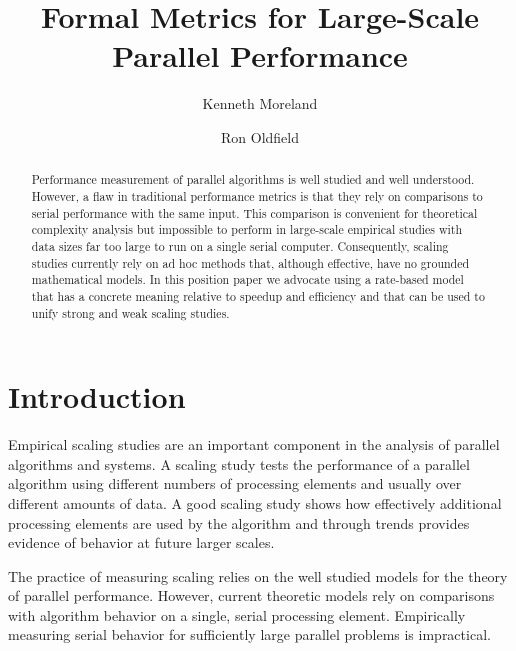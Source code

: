 \documentclass{llncs}
\begin{document}
\sloppy

%
\title{Formal Metrics for Large-Scale Parallel Performance}


\author{Kenneth Moreland \and Ron Oldfield}


\maketitle


\begin{abstract}
Performance measurement of parallel algorithms is well studied and well
understood. However, a flaw in traditional performance metrics is that they
rely on comparisons to serial performance with the same input. This
comparison is convenient for theoretical complexity analysis but impossible
to perform in large-scale empirical studies with data sizes far too large
to run on a single serial computer. Consequently, scaling studies currently
rely on ad hoc methods that, although effective, have no grounded
mathematical models. In this position paper we advocate using a rate-based
model that has a concrete meaning relative to speedup and efficiency and
that can be used to unify strong and weak scaling studies.
\end{abstract}

\section{Introduction}

\noindent
Empirical scaling studies are an important component in the analysis of
parallel algorithms and systems. A scaling study tests the performance of a
parallel algorithm using different numbers of processing elements and
usually over different amounts of data. A good scaling study shows how
effectively additional processing elements are used by the algorithm and
through trends provides evidence of behavior at future larger scales.

The practice of measuring scaling relies on the well studied models for the
theory of parallel performance. However, current theoretic
models rely on comparisons with algorithm behavior on a single, serial
processing element. Empirically measuring serial behavior for sufficiently
large parallel problems is impractical.
\end{document}
